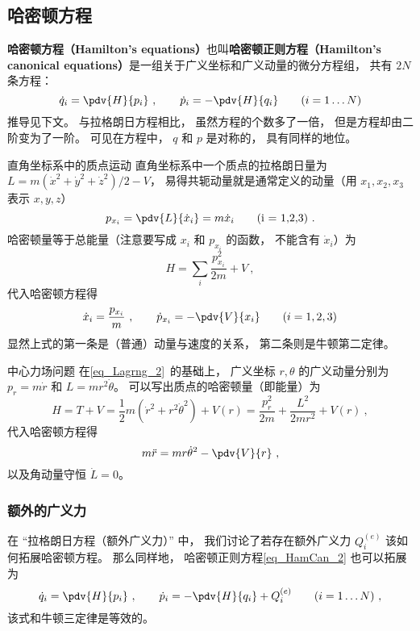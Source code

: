 \subsection{哈密顿方程}
\textbf{哈密顿方程（Hamilton's equations）}也叫\textbf{哈密顿正则方程（Hamilton's canonical equations）}是一组关于广义坐标和广义动量的微分方程组， 共有 $2N$ 条方程：
\begin{equation}\label{eq_HamCan_2}
\dot q_i = \pdv{H}{p_i}~,
\qquad
\dot p_i = -\pdv{H}{q_i}
\qquad
(i = 1\dots N)
\end{equation}
推导见下文。 与拉格朗日方程相比， 虽然方程的个数多了一倍， 但是方程却由二阶变为了一阶。 可见在方程中， $q$ 和 $p$ 是对称的， 具有同样的地位。

\begin{example}{直角坐标系中的质点运动}
直角坐标系中一个质点的拉格朗日量为 $L = m(\dot x^2 + \dot y^2 + \dot z^2)/2 - V$， 易得共轭动量就是通常定义的动量（用 $x_1,x_2,x_3$ 表示 $x, y, z$）
\begin{equation}
p_{x_i} = \pdv{L}{\dot x_i} = m\dot x_i \qquad \text{(i = 1,2,3)}~.
\end{equation}
哈密顿量等于总能量（注意要写成 $x_i$ 和 $p_{x_i}$ 的函数， 不能含有 $\dot x_i$）为
\begin{equation}
H = \sum_i \frac{p_{x_i}^2}{2m} + V~,
\end{equation}
代入哈密顿方程得
\begin{equation}
\dot x_i = \frac{p_{x_i}}{m}~,
\qquad
\dot p_{x_i} = -\pdv{V}{x_i}
\qquad (i = 1,2,3)
\end{equation}
显然上式的第一条是（普通）动量与速度的关系， 第二条则是牛顿第二定律。
\end{example}

\begin{example}{中心力场问题}\label{ex_HamCan_1}
在\autoref{eq_Lagrng_2}~的基础上， 广义坐标 $r, \theta$ 的广义动量分别为 $p_r = m\dot r$ 和 $L = mr^2\dot \theta$。 可以写出质点的哈密顿量（即能量）为
\begin{equation}\label{eq_HamCan_3}
H = T + V = \frac12 m(\dot r^2 + r^2 \dot \theta^2) + V(r) = \frac{p_r^2}{2m} + \frac{L^2}{2mr^2} + V(r)~,
\end{equation}
代入哈密顿方程得
\begin{equation}
m\ddot r = mr \dot \theta^2 - \pdv{V}{r}~,
\end{equation}
以及角动量守恒 $\dot L = 0$。
\end{example}

\subsubsection{额外的广义力}
在 “拉格朗日方程（额外广义力）” 中， 我们讨论了若存在额外广义力 $Q_i^{(e)}$ 该如何拓展哈密顿方程。 那么同样地， 哈密顿正则方程\autoref{eq_HamCan_2} 也可以拓展为
\begin{equation}\label{eq_HamCan_5}
\dot q_i = \pdv{H}{p_i}~,
\qquad
\dot p_i = -\pdv{H}{q_i} + Q_i^{(e)}
\qquad
(i = 1\dots N)~,
\end{equation}
该式和牛顿三定律是等效的。

